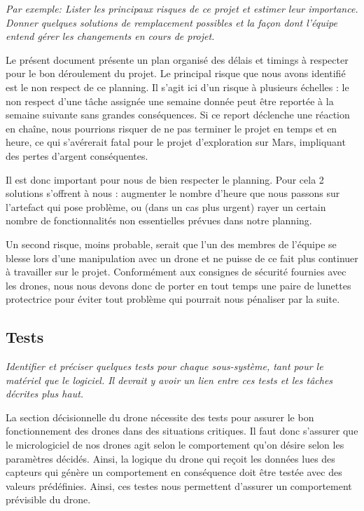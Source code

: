 \documentclass{mistcoursedoc}
\begin{document}
\textit{Par exemple: Lister les principaux risques de ce projet et estimer leur importance.  Donner quelques solutions de remplacement possibles et la façon dont l’équipe entend gérer les changements en cours de projet.}

Le présent document présente un plan organisé des délais et timings à respecter pour le bon déroulement du projet. Le principal risque que nous avons identifié est le non respect de ce planning. Il s'agit ici d'un risque à plusieurs échelles : le non respect d'une tâche assignée une semaine donnée peut être reportée à la semaine suivante sans grandes conséquences. Si ce report déclenche une réaction en chaîne, nous pourrions risquer de ne pas terminer le projet en temps et en heure, ce qui s'avérerait fatal pour le projet d'exploration sur Mars, impliquant des pertes d'argent conséquentes.

Il est donc important pour nous de bien respecter le planning. Pour cela 2 solutions s'offrent à nous : augmenter le nombre d'heure que nous passons sur l'artefact qui pose problème, ou (dans un cas plus urgent) rayer un certain nombre de fonctionnalités non essentielles prévues dans notre planning.

Un second risque, moins probable, serait que l'un des membres de l'équipe se blesse lors d'une manipulation avec un drone et ne puisse de ce fait plus continuer à travailler sur le projet. Conformément aux consignes de sécurité fournies avec les drones, nous nous devons donc de porter en tout temps une paire de lunettes protectrice pour éviter tout problème qui pourrait nous pénaliser par la suite.

\subsection{Tests}

\textit{Identifier et préciser quelques tests pour chaque sous-système, tant pour le matériel que le logiciel.  Il devrait y avoir un lien entre ces tests et les tâches décrites plus haut.}

La section décisionnelle du drone nécessite des tests pour assurer le bon fonctionnement des drones dans des situations critiques. Il faut donc s’assurer que le micrologiciel de nos drones agit selon le comportement qu’on désire selon les paramètres décidés. Ainsi, la logique du drone qui reçoit les données lues des capteurs qui génère un comportement en conséquence doit être testée avec des valeurs prédéfinies. Ainsi, ces testes nous permettent d’assurer un comportement prévisible du drone.
\end{document}
